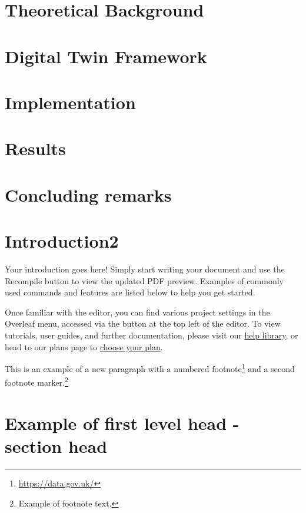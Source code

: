 \documentclass[12pt,a4paper]{article}
\begin{document}
\section{Theoretical Background}\label{sec:theory}
\section{Digital Twin Framework}\label{sec:dtwin}
\section{Implementation}\label{sec:impl}
\section{Results}\label{sec:res}
\section{Concluding remarks}\label{sec:conc}

\section{Introduction2}

Your introduction goes here! Simply start writing your document and use the Recompile button to view the updated PDF preview. Examples of commonly used commands and features are listed below to help you get started.
\lipsum[2]

Once familiar with the editor, you can find various project settings in the Overleaf menu, accessed via the button at the top left of the editor. To view tutorials, user guides, and further documentation, please visit our \href{https://www.overleaf.com/learn}{help library}, or head to our plans page to \href{https://www.overleaf.com/user/subscription/plans}{choose your plan}. 

This is an example of a new paragraph with a numbered footnote\footnote{\url{https://data.gov.uk/}} and a second footnote marker.\footnote{Example of footnote text.}


\section{Example of first level head - section head}\label{sec2}

\lipsum[4]
\end{document}
